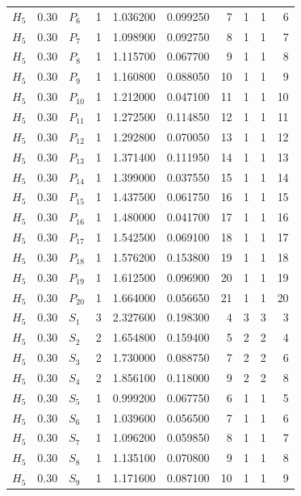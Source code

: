 \begin{longtable}{lrlrrrrrrr}
$H_5$ & 0.30 & $P_{6}$ & 1 & 1.036200 & 0.099250 & 7 & 1 & 1 & 6\\
$H_5$ & 0.30 & $P_{7}$ & 1 & 1.098900 & 0.092750 & 8 & 1 & 1 & 7\\
$H_5$ & 0.30 & $P_{8}$ & 1 & 1.115700 & 0.067700 & 9 & 1 & 1 & 8\\
$H_5$ & 0.30 & $P_{9}$ & 1 & 1.160800 & 0.088050 & 10 & 1 & 1 & 9\\
$H_5$ & 0.30 & $P_{10}$ & 1 & 1.212000 & 0.047100 & 11 & 1 & 1 & 10\\
$H_5$ & 0.30 & $P_{11}$ & 1 & 1.272500 & 0.114850 & 12 & 1 & 1 & 11\\
$H_5$ & 0.30 & $P_{12}$ & 1 & 1.292800 & 0.070050 & 13 & 1 & 1 & 12\\
$H_5$ & 0.30 & $P_{13}$ & 1 & 1.371400 & 0.111950 & 14 & 1 & 1 & 13\\
$H_5$ & 0.30 & $P_{14}$ & 1 & 1.399000 & 0.037550 & 15 & 1 & 1 & 14\\
$H_5$ & 0.30 & $P_{15}$ & 1 & 1.437500 & 0.061750 & 16 & 1 & 1 & 15\\
$H_5$ & 0.30 & $P_{16}$ & 1 & 1.480000 & 0.041700 & 17 & 1 & 1 & 16\\
$H_5$ & 0.30 & $P_{17}$ & 1 & 1.542500 & 0.069100 & 18 & 1 & 1 & 17\\
$H_5$ & 0.30 & $P_{18}$ & 1 & 1.576200 & 0.153800 & 19 & 1 & 1 & 18\\
$H_5$ & 0.30 & $P_{19}$ & 1 & 1.612500 & 0.096900 & 20 & 1 & 1 & 19\\
$H_5$ & 0.30 & $P_{20}$ & 1 & 1.664000 & 0.056650 & 21 & 1 & 1 & 20\\
$H_5$ & 0.30 & $S_{1}$ & 3 & 2.327600 & 0.198300 & 4 & 3 & 3 & 3\\
$H_5$ & 0.30 & $S_{2}$ & 2 & 1.654800 & 0.159400 & 5 & 2 & 2 & 4\\
$H_5$ & 0.30 & $S_{3}$ & 2 & 1.730000 & 0.088750 & 7 & 2 & 2 & 6\\
$H_5$ & 0.30 & $S_{4}$ & 2 & 1.856100 & 0.118000 & 9 & 2 & 2 & 8\\
$H_5$ & 0.30 & $S_{5}$ & 1 & 0.999200 & 0.067750 & 6 & 1 & 1 & 5\\
$H_5$ & 0.30 & $S_{6}$ & 1 & 1.039600 & 0.056500 & 7 & 1 & 1 & 6\\
$H_5$ & 0.30 & $S_{7}$ & 1 & 1.096200 & 0.059850 & 8 & 1 & 1 & 7\\
$H_5$ & 0.30 & $S_{8}$ & 1 & 1.135100 & 0.070800 & 9 & 1 & 1 & 8\\
$H_5$ & 0.30 & $S_{9}$ & 1 & 1.171600 & 0.087100 & 10 & 1 & 1 & 9\\

\end{longtable}
